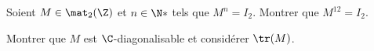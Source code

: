 \begin{enonce}
\begin{exercise}[ID={RMS133 E690},subtitle={Mines-Ponts PSI 2022},tags={},difficulty={}]
  Soient $M\in\mat_2(\Z)$ et $n\in\N*$ tels que $M^n = I_2$.
  Montrer que $M^{12}=I_2$.

  \begin{hint}
    Montrer que $M$ est $\C$-diagonalisable et considérer $\tr(M)$.
  \end{hint}
\end{exercise}
\begin{solution}
\end{solution}
\end{enonce}
